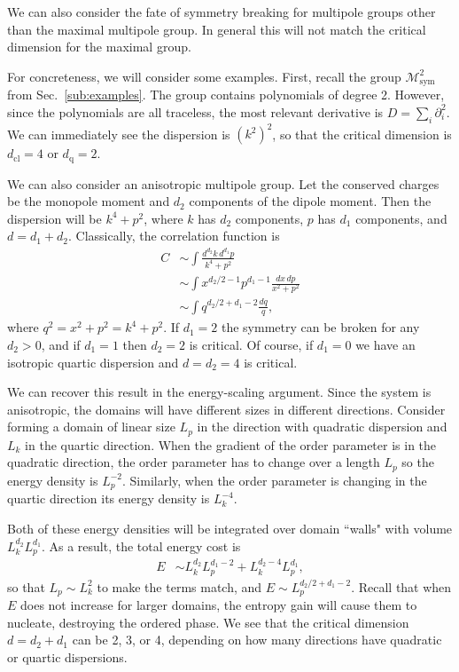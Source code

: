 \documentclass[pra,aps,twocolumn, amsfonts,amsmath,amssymb,nofootinbib,superscriptaddress]{revtex4-2}
\newcommand{\nn}{\nonumber\\}
\newcommand{\cl}{\text{cl}}
\newcommand{\q}{\text{q}}
\begin{document}
We can also consider the fate of symmetry breaking for multipole groups other than the maximal multipole group. In general this will not match the critical dimension for the maximal group. 

For concreteness, we will consider some examples. First, recall the group $\mathcal{M}^2_\text{sym}$ from Sec.~\ref{sub:examples}. The group contains polynomials of degree 2. However, since the polynomials are all traceless, the most relevant derivative is $D = \sum_i \partial^2_i$.  We can immediately see the dispersion is $(k^2)^2$, so that the critical dimension is $d_\cl = 4$ or $d_\q = 2$.

We can also consider an anisotropic multipole group. 
Let the conserved charges be the monopole moment and $d_2$ components of the dipole moment. Then the dispersion will be $k^4 + p^2$, where $k$ has $d_2$ components, $p$ has $d_1$ components, and $d = d_1+d_2$. Classically, the correlation function is
\begin{align}
C &\sim \int \frac{d^{d_2} k \, d^{d_1} p}{k^4 + p^2}\nn
&\sim \int x^{d_2/2 -1} p^{d_1-1} \frac{dx\, dp}{x^2 +p^2} \nn
&\sim \int q^{d_2/2 + d_1 - 2}\frac{dq}{q},
\end{align}
where $q^2 = x^2 + p^2 = k^4 + p^2$. 
If $d_1=2$ the symmetry can be broken for any $d_2>0$, and if $d_1=1$ then $d_2=2$  is critical. Of course, if $d_1=0$ we have an isotropic quartic dispersion and $d=d_2=4$ is critical. 

We can recover this result in  the energy-scaling argument. Since the system is anisotropic, the domains will have different sizes in different directions. Consider forming a domain of linear size $L_p$ in the  direction with quadratic dispersion and $L_k$ in the quartic direction. When the gradient of the order parameter is in the quadratic direction, the order parameter has to change over a length $L_p$ so the energy density is $L_p^{-2}$. Similarly, when the order parameter is changing in the quartic direction its energy density is $L_k^{-4}$. 

Both of these energy densities will be integrated over domain ``walls" with volume $L_k^{d_2} L_p^{d_1}$.
As a result, the total energy cost is
\begin{align}
E &\sim L_k^{d_2} L_p^{d_1-2} + L_k^{d_2-4} L_p^{d_1},
\end{align}
so that $L_p \sim L_k^2$ to make the terms match, and $E\sim L_p^{d_2/2+d_1-2}$. Recall that when $E$ does not increase for larger domains, the entropy gain will cause them to nucleate, destroying the ordered phase.
We see that the critical dimension $d= d_2 + d_1$ can be 2, 3, or 4, depending on how many directions have quadratic or quartic dispersions.
\end{document}
